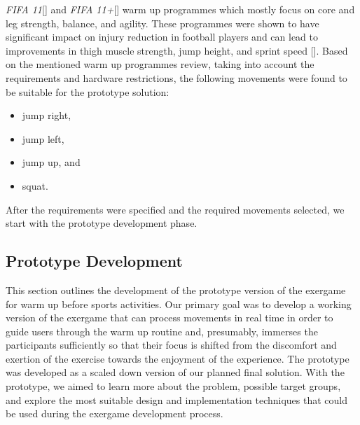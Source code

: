 \textit{FIFA 11}[] and \textit{FIFA 11+}[] warm up programmes which mostly focus on core and leg strength, balance, and agility. These programmes were shown to have significant impact on injury reduction in football players and can lead to improvements in thigh muscle strength, jump height, and sprint speed [].%
Based on the mentioned warm up programmes review, taking into account the requirements and hardware restrictions, the following movements were found to be suitable for the prototype solution: 
\begin{itemize}
\item jump right,
\item jump left,
\item jump up, and
\item squat.
\end{itemize}
After the requirements were specified and the required movements selected, we start with the prototype development phase.
\subsection{Prototype Development}
This section outlines the development of the prototype version of the exergame for warm up before sports activities. Our primary goal was to develop a working version of the exergame that can process movements in real time in order to guide users through the warm up routine and, presumably, immerses the participants sufficiently so that their focus is shifted from the discomfort and exertion of the exercise towards the enjoyment of the experience. The prototype was developed as a scaled down version of our planned final solution. With the prototype, we aimed to learn more about the problem, possible target groups, and explore the most suitable design and implementation techniques that could be used during the exergame development process. 
